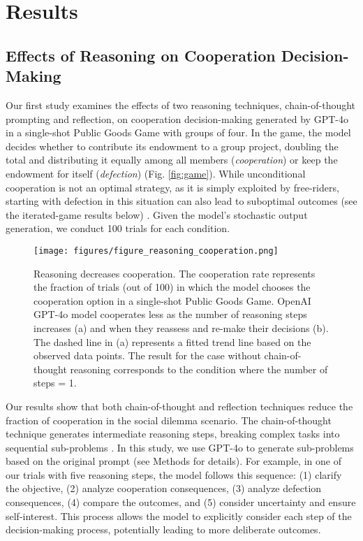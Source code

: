 \section*{Results}
\subsection*{Effects of Reasoning on Cooperation Decision-Making}
Our first study examines the effects of two reasoning techniques, chain-of-thought prompting and reflection, on cooperation decision-making generated by GPT-4o in a single-shot Public Goods Game with groups of four.
In the game, the model decides whether to contribute its endowment to a group project, doubling the total and distributing it equally among all members (\textit{cooperation}) or keep the endowment for itself (\textit{defection}) \cite{kollock1998social} (Fig. \ref{fig:game}).
While unconditional cooperation is not an optimal strategy, as it is simply exploited by free-riders, starting with defection in this situation can also lead to suboptimal outcomes (see the iterated-game results below) \cite{axelrod1984pg, nowak2006evolutionary}.
Given the model's stochastic output generation, we conduct 100 trials for each condition.


\begin{figure}[ht]
  \centering 
  \texttt{[image: figures/figure\_reasoning\_cooperation.png]}
  \caption{Reasoning decreases cooperation. The cooperation rate represents the fraction of trials (out of 100) in which the model chooses the cooperation option in a single-shot Public Goods Game. OpenAI GPT-4o model cooperates less as the number of reasoning steps increases (a) and when they reassess and re-make their decisions (b). The dashed line in (a) represents a fitted trend line based on the observed data points. The result for the case without chain-of-thought reasoning corresponds to the condition where the number of steps = 1.}
  \label{fig:reasoning}
\end{figure}

Our results show that both chain-of-thought and reflection techniques reduce the fraction of cooperation in the social dilemma scenario. 
The chain-of-thought technique generates intermediate reasoning steps, breaking complex tasks into sequential sub-problems \cite{wei2022chain}.
In this study, we use GPT-4o to generate sub-problems based on the original prompt (see Methods for details).
For example, in one of our trials with five reasoning steps, the model follows this sequence: (1) clarify the objective, (2) analyze cooperation consequences, (3) analyze defection consequences, (4) compare the outcomes, and (5) consider uncertainty and ensure self-interest.
This process allows the model to explicitly consider each step of the decision-making process, potentially leading to more deliberate outcomes.

